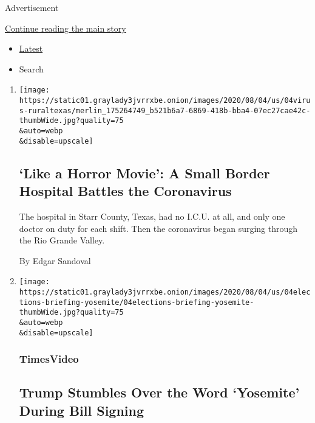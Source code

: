 Advertisement

\protect\hyperlink{after-mid1}{Continue reading the main story}

\begin{itemize}
\tightlist
\item
  \protect\hyperlink{stream-panel}{Latest}
\item
  Search
\end{itemize}

\begin{enumerate}
\def\labelenumi{\arabic{enumi}.}
\item
  \href{/2020/08/04/us/texas-coronavirus-rio-grande-valley-starr-county.html}{}

  \texttt{[image: https://static01.graylady3jvrrxbe.onion/images/2020/08/04/us/04virus-ruraltexas/merlin\_175264749\_b521b6a7-6869-418b-bba4-07ec27cae42c-thumbWide.jpg?quality=75\\\&auto=webp\\\&disable=upscale]}

  \hypertarget{like-a-horror-movie-a-small-border-hospital-battles-the-coronavirus}{%
  \subsection{`Like a Horror Movie': A Small Border Hospital Battles the
  Coronavirus}\label{like-a-horror-movie-a-small-border-hospital-battles-the-coronavirus}}

  The hospital in Starr County, Texas, had no I.C.U. at all, and only
  one doctor on duty for each shift. Then the coronavirus began surging
  through the Rio Grande Valley.

  By Edgar Sandoval
\item
  \href{/video/us/100000007272140/trump-stumbles-over-yosemite.html}{}

  \texttt{[image: https://static01.graylady3jvrrxbe.onion/images/2020/08/04/us/04elections-briefing-yosemite/04elections-briefing-yosemite-thumbWide.jpg?quality=75\\\&auto=webp\\\&disable=upscale]}

  \hypertarget{timesvideo}{%
  \subsubsection{TimesVideo}\label{timesvideo}}

  \hypertarget{trump-stumbles-over-the-word-yosemite-during-bill-signing}{%
  \subsection{Trump Stumbles Over the Word `Yosemite' During Bill
  Signing}\label{trump-stumbles-over-the-word-yosemite-during-bill-signing}}


\end{enumerate}
